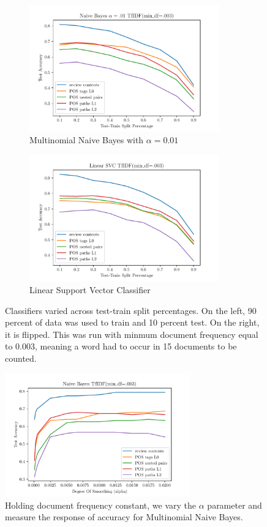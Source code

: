 \documentclass[11pt,a4paper]{article}
\begin{document}
\begin{figure}[h!]
    \centering
     \begin{subfigure}{0.49\textwidth}
    \centering
    \includegraphics[width=8.2cm]{figures/nb_x_prev_seen.pdf}
         \caption{Multinomial Naive Bayes with $\alpha = 0.01$}
         \label{fig:nb_x_prev_seen}
     \end{subfigure}
    \hfill
    \begin{subfigure}{0.49\textwidth}
    \centering
    \includegraphics[width=8.2cm]{figures/svm_x_prev_seen.pdf}
         \caption{Linear Support Vector Classifier}
         \label{fig:svm_x_prev_seen}
     \end{subfigure}
      \caption{Classifiers varied across test-train split percentages. On the left, 90 percent of data was used to train and 10 percent test. On the right, it is flipped. This was run with minmum document frequency equal to 0.003, meaning a word had to occur in 15 documents to be counted.}
        \label{fig:prev_seen}
\end{figure}
\begin{figure}[h!]
    \centering
    \includegraphics[width=8cm]{figures/nb_x_alpha.pdf}
         \caption{Holding document frequency constant, we vary the $\alpha$ parameter and measure the response of accuracy for Multinomial Naive Bayes.}
         \label{fig:nb_x_alpha}
\end{figure}
\end{document}
